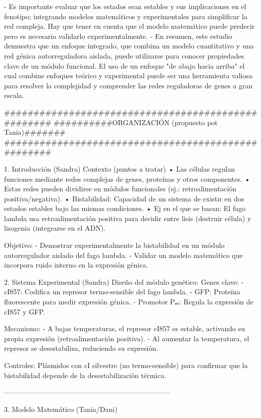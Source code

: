     - Es importante evaluar que los estados sean estables y sus implicaciones en el fenotipo; integrando modelos matemáticos y experimentales para simplificar la red compleja. Hay que tener en cuenta que el modelo matemático puede predecir pero es necesario validarlo experimentalmente.
    - En resumen, este estudio demuestra que un enfoque integrado, que combina un modelo cuantitativo y una red génica autorreguladora aislada, puede utilizarse para conocer propiedades clave de un módulo funcional. El uso de un enfoque "de abajo hacia arriba" el cual combine enfoques teórico y experimental puede ser una herramienta valiosa para resolver la complejidad y comprender las redes reguladoras de genes a gran escala.


###################################################
##########ORGANIZACIÓN (propuesto pot Tania)#######
###################################################

1. Introducción (Sandra)
Contexto (puntos a tratar)
•	Las células regulan funciones mediante redes complejas de genes, proteínas y otros componentes.
•	Estas redes pueden dividirse en módulos funcionales (ej.: retroalimentación positiva/negativa).
•	Bistabilidad: Capacidad de un sistema de existir en dos estados estables bajo las mismas condiciones.
•	Ej en el que se basan: El fago lambda usa retroalimentación positiva para decidir entre lisis (destruir célula) y lisogenia (integrarse en el ADN).

Objetivo:
- Demostrar experimentalmente la bistabilidad en un módulo autorregulador aislado del fago lambda.
- Validar un modelo matemático que incorpora ruido interno en la expresión génica.

2. Sistema Experimental (Sandra)
Diseño del módulo genético:
Genes clave:
- cI857: Codifica un represor termo-sensible del fago lambda.
- GFP: Proteína fluorescente para medir expresión génica.
- Promotor Pₘ: Regula la expresión de cI857 y GFP.

Mecanismo:
- A bajas temperaturas, el represor cI857 es estable, activando su propia expresión (retroalimentación positiva).
- Al aumentar la temperatura, el represor se desestabiliza, reduciendo su expresión.

Controles: Plásmidos con cI silvestre (no termo-sensible) para confirmar que la bistabilidad depende de la desestabilización térmica.

-----------------------------------------------------------------------

3. Modelo Matemático (Tania/Dani)

